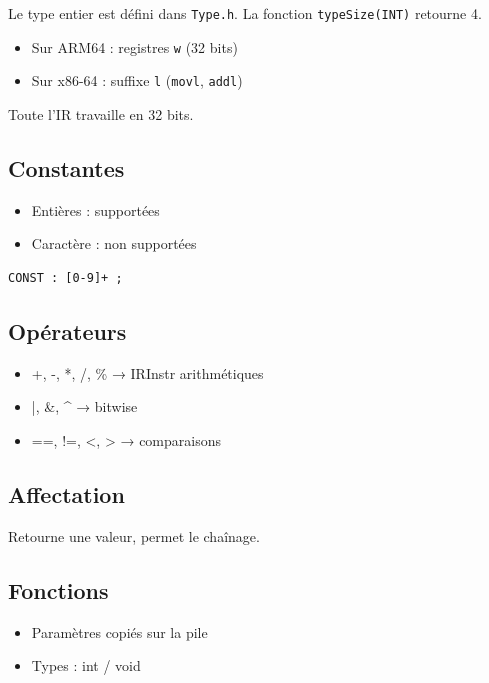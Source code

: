 \documentclass[11pt,a4paper]{article}
\begin{document}
Le type entier est défini dans \texttt{Type.h}. La fonction \texttt{typeSize(INT)} retourne 4.

\begin{itemize}
  \item Sur ARM64 : registres \texttt{w} (32 bits)
  \item Sur x86-64 : suffixe \texttt{l} (\texttt{movl}, \texttt{addl})
\end{itemize}

Toute l'IR travaille en 32 bits.

\subsection{Constantes}

\begin{itemize}
  \item Entières : supportées
  \item Caractère : non supportées
\end{itemize}

\begin{lstlisting}
CONST : [0-9]+ ;
\end{lstlisting}

\subsection{Opérateurs}

\begin{itemize}
  \item +, -, *, /, \% → IRInstr arithmétiques
  \item |, \&, ^ → bitwise
  \item ==, !=, <, > → comparaisons
\end{itemize}

\subsection{Affectation}

Retourne une valeur, permet le chaînage.

\subsection{Fonctions}

\begin{itemize}
  \item Paramètres copiés sur la pile
  \item Types : int / void
\end{itemize}
\end{document}
